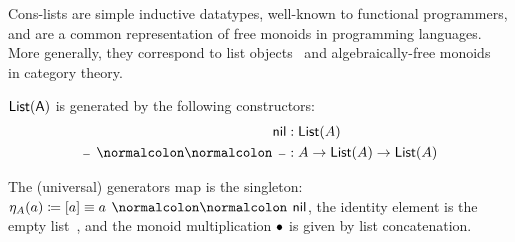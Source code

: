 Cons-lists are simple inductive datatypes, well-known to functional programmers,
and are a common representation of free monoids in programming languages.
%
More generally, they correspond to
list objects~\cite{cockettListarithmeticDistributiveCategories1990,maiettiJoyalsArithmeticUniverse2010}
and algebraically-free monoids~\cite{kellyUnifiedTreatmentTransfinite1980} in category theory.
%
\begin{definition}
    \label{def:lists}
    $\mathsf{List(A)}$ is generated by the following constructors:
    \begin{align*}
        \nil              & : \List(A)                    \\
        \blank\cons\blank & : A \to \List(A) \to \List(A)
    \end{align*}
\end{definition}
%
The (universal) generators map is the singleton: $\eta_A(a) \defeq [a] \jdgeq a \cons \nil$,
the identity element is the empty list~,
and the monoid multiplication $\mathbin{\bullet}$ is given by list concatenation.
%

